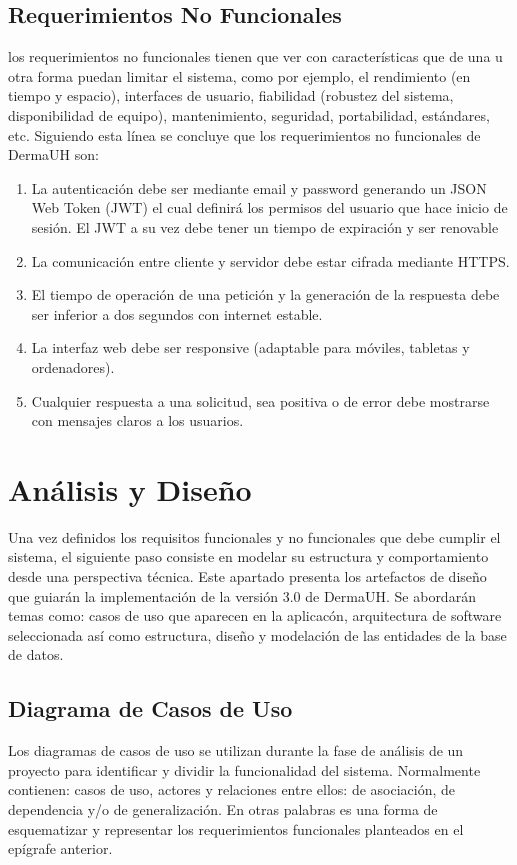 \subsection{Requerimientos No Funcionales}
los requerimientos no funcionales tienen que ver con características que de una u otra
forma puedan limitar el sistema, como por ejemplo, el rendimiento (en tiempo y espacio), interfaces de
usuario, fiabilidad (robustez del sistema, disponibilidad de equipo), mantenimiento, seguridad,
portabilidad, estándares, etc. Siguiendo esta l\'inea se concluye que los requerimientos no funcionales
de DermaUH son:
\begin{enumerate}
    \item[RNF1] La autenticaci\'on debe ser mediante email y password generando un JSON Web Token (JWT) el cual definir\'a los permisos del usuario que hace inicio de sesi\'on. El JWT a su vez debe tener un tiempo de expiraci\'on y ser renovable 
    \item[RNF2] La comunicación entre cliente y servidor debe estar cifrada mediante HTTPS.
    \item[RNF3] El tiempo de operaci\'on de una petici\'on y la generaci\'on de la respuesta debe ser inferior a dos segundos con internet estable.
    \item[RNF4] La interfaz web debe ser responsive (adaptable para m\'oviles, tabletas y ordenadores).
    \item[RNF5] Cualquier respuesta a una solicitud, sea positiva o de error debe mostrarse con mensajes claros a los usuarios.
\end{enumerate}

\section{Análisis y Diseño}

Una vez definidos los requisitos funcionales y no funcionales que debe cumplir el sistema, 
el siguiente paso consiste en modelar su estructura y comportamiento desde una perspectiva técnica. 
Este apartado presenta los artefactos de diseño que guiarán la implementación de la versión 3.0 de 
DermaUH. Se abordar\'an temas como: casos de uso que aparecen en la aplicac\'on, arquitectura 
de software seleccionada así como estructura, dise\~no y modelaci\'on de las entidades de 
la base de datos. 

\subsection{Diagrama de Casos de Uso}
Los diagramas de casos de uso se utilizan durante la fase de análisis de un proyecto para
identificar y dividir la funcionalidad del sistema. Normalmente contienen: casos de uso,
actores y relaciones entre ellos: de asociación, de dependencia y/o de generalización\cite{diagramaUML}. 
En otras palabras es una forma de esquematizar y representar los requerimientos funcionales planteados
en el ep\'igrafe anterior.

